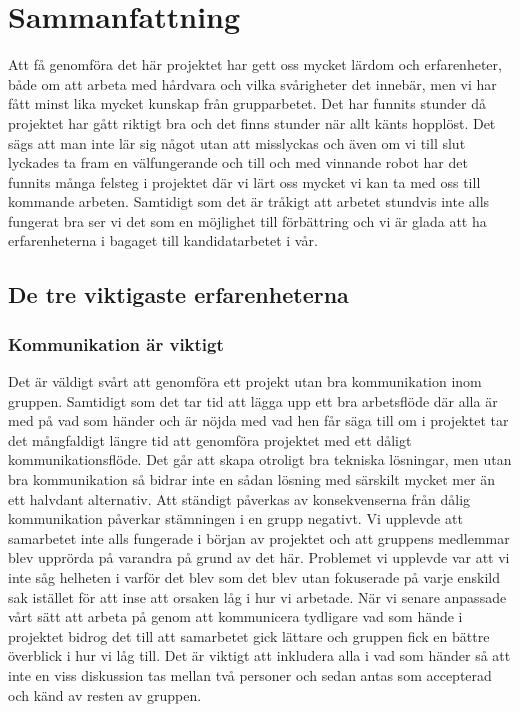 \documentclass{article}
\begin{document}
\section{Sammanfattning}
Att få genomföra det här projektet har gett oss mycket lärdom och erfarenheter, både om att arbeta med hårdvara och vilka svårigheter det innebär, men vi har fått minst lika mycket kunskap från grupparbetet. Det har funnits stunder då projektet har gått riktigt bra och det finns stunder när allt känts hopplöst. Det sägs att man inte lär sig något utan att misslyckas och även om vi till slut lyckades ta fram en välfungerande och till och med vinnande robot har det funnits många felsteg i projektet där vi lärt oss mycket vi kan ta med oss till kommande arbeten. Samtidigt som det är tråkigt att arbetet stundvis inte alls fungerat bra ser vi det som en möjlighet till förbättring och vi är glada att ha erfarenheterna i bagaget till kandidatarbetet i vår.

\subsection{De tre viktigaste erfarenheterna}
\subsubsection{Kommunikation är viktigt}
Det är väldigt svårt att genomföra ett projekt utan bra kommunikation inom gruppen. Samtidigt som det tar tid att lägga upp ett bra arbetsflöde där alla är med på vad som händer och är nöjda med vad hen får säga till om i projektet tar det mångfaldigt längre tid att genomföra projektet med ett dåligt kommunikationsflöde. Det går att skapa otroligt bra tekniska lösningar, men utan bra kommunikation så bidrar inte en sådan lösning med särskilt mycket mer än ett halvdant alternativ.
\newline\newline
Att ständigt påverkas av konsekvenserna från dålig kommunikation påverkar stämningen i en grupp negativt. Vi upplevde att samarbetet inte alls fungerade i början av projektet och att gruppens medlemmar blev upprörda på varandra på grund av det här. Problemet vi upplevde var att vi inte såg helheten i varför det blev som det blev utan fokuserade på varje enskild sak istället för att inse att orsaken låg i hur vi arbetade. När vi senare anpassade vårt sätt att arbeta på genom att kommunicera tydligare vad som hände i projektet bidrog det till att samarbetet gick lättare och gruppen fick en bättre överblick i hur vi låg till. Det är viktigt att inkludera alla i vad som händer så att inte en viss diskussion tas mellan två personer och sedan antas som accepterad och känd av resten av gruppen.
\end{document}
